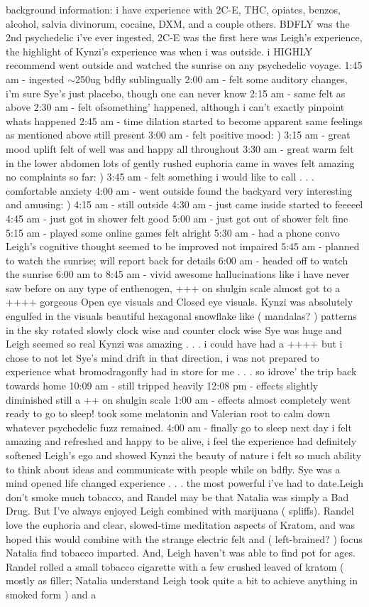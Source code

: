 \documentclass[12pt]{book}
\begin{document}
background information: i have experience with 2C-E, THC, opiates, benzos, alcohol, salvia divinorum, cocaine, DXM, and a couple others. BDFLY was the 2nd psychedelic i've ever ingested, 2C-E was the first here was Leigh's experience, the highlight of Kynzi's experience was when i was outside. i HIGHLY recommend went outside and watched the sunrise on any psychedelic voyage. 1:45 am - ingested $\sim$250ug bdfly sublingually 2:00 am - felt some auditory changes, i'm sure Sye's just placebo, though one can never know 2:15 am - same felt as above 2:30 am - felt ofsomething' happened, although i can't exactly pinpoint whats happened 2:45 am - time dilation started to become apparent same feelings as mentioned above still present 3:00 am - felt positive mood: ) 3:15 am - great mood uplift felt of well was and happy all throughout 3:30 am - great warm felt in the lower abdomen lots of gently rushed euphoria came in waves felt amazing no complaints so far: ) 3:45 am - felt something i would like to call . . .  comfortable anxiety 4:00 am - went outside found the backyard very interesting and amusing: ) 4:15 am - still outside 4:30 am - just came inside started to feeeeel 4:45 am - just got in shower felt good 5:00 am - just got out of shower felt fine 5:15 am - played some online games felt alright 5:30 am - had a phone convo Leigh's cognitive thought seemed to be improved not impaired 5:45 am - planned to watch the sunrise; will report back for details 6:00 am - headed off to watch the sunrise 6:00 am to 8:45 am - vivid awesome hallucinations like i have never saw before on any type of enthenogen, +++ on shulgin scale almost got to a ++++ gorgeous Open eye visuals and Closed eye visuals. Kynzi was absolutely engulfed in the visuals beautiful hexagonal snowflake like ( mandalas? ) patterns in the sky rotated slowly clock wise and counter clock wise Sye was huge and Leigh seemed so real Kynzi was amazing . . .  i could have had a ++++ but i chose to not let Sye's mind drift in that direction, i was not prepared to experience what bromodragonfly had in store for me . . .  so idrove' the trip back towards home 10:09 am - still tripped heavily 12:08 pm - effects slightly diminished still a ++ on shulgin scale 1:00 am - effects almost completely went ready to go to sleep! took some melatonin and Valerian root to calm down whatever psychedelic fuzz remained. 4:00 am - finally go to sleep next day i felt amazing and refreshed and happy to be alive, i feel the experience had definitely softened Leigh's ego and showed Kynzi the beauty of nature i felt so much ability to think about ideas and communicate with people while on bdfly. Sye was a mind opened life changed experience . . .  the most powerful i've had to date.Leigh don't smoke much tobacco, and Randel may be that Natalia was simply a Bad Drug. But I've always enjoyed Leigh combined with marijuana ( spliffs). Randel love the euphoria and clear, slowed-time meditation aspects of Kratom, and was hoped this would combine with the strange electric felt and ( left-brained? ) focus Natalia find tobacco imparted. And, Leigh haven't was able to find pot for ages. Randel rolled a small tobacco cigarette with a few crushed leaved of kratom ( mostly as filler; Natalia understand Leigh took quite a bit to achieve anything in smoked form ) and a 
\end{document}
